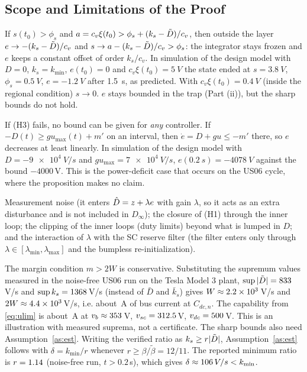 \subsection{Scope and Limitations of the Proof}\label{ap:limits}
\begin{remark}\label{rem:deadlock}
If $s(t_0)>\phi_s$ and $a=c_v\xi(t_0)>\phi_s+(k_s-\tilde{D})/c_v$, then outside the layer $e\to-(k_s-\tilde{D})/c_v$ and $s\to a-(k_s-\tilde{D})/c_v>\phi_s$: the integrator stays frozen and $e$ keeps a constant offset of order $k_s/c_v$. In simulation of the design model with $D=0$, $k_s=k_{\min}$, $e(t_0)=0$ and $c_v\xi(t_0)=\SI{5}{V}$ the state ended at $s=\SI{3.8}{V}$, $\phi_s=\SI{0.5}{V}$, $e=\SI{-1.2}{V}$ after \SI{1.5}{s}, as predicted. With $c_v\xi(t_0)=\SI{0.4}{V}$ (inside the regional condition) $s\to0$. $e$ stays bounded in the trap (Part (ii)), but the sharp bounds do not hold.
\end{remark}
\begin{remark}\label{rem:deficit}
If (H3) fails, no bound can be given for \emph{any} controller. If $-D(t)\ge gu_{\max}(t)+m'$ on an interval, then $\dot e=D+gu\le-m'$ there, so $e$ decreases at least linearly. In simulation of the design model with $D=\SI{-9e4}{V/s}$ and $gu_{\max}=\SI{7e4}{V/s}$, $e(\SI{0.2}{s})=\SI{-4078}{V}$ against the bound $-4000$\,V. This is the power-deficit case that occurs on the US06 cycle, where the proposition makes no claim.
\end{remark}
\begin{remark}
Measurement noise (it enters $\hat{D}=z+\lambda e$ with gain $\lambda$, so it acts as an extra disturbance and is not included in $D_\infty$); the closure of (H1) through the inner loop; the clipping of the inner loops (duty limits) beyond what is lumped in $D$; and the interaction of $\lambda$ with the SC reserve filter (the filter enters only through $\lambda\in[\lambda_{\min},\lambda_{\max}]$ and the bumpless re-initialization).
\end{remark}
\begin{remark}
The margin condition $m>2W$ is conservative. Substituting the supremum values measured in the noise-free US06 run on the Tesla Model 3 plant, $\sup|\tilde{D}|=833$\,V/s and $\sup k_s=1368$\,V/s (instead of $\bar D$ and $\bar k_s$) gives $W\approx2.2\times10^{3}$\,V/s and $2W\approx4.4\times10^{3}$\,V/s, i.e. about \AppTwoWA\,A of bus current at $C_{dc,n}$. The capability from \eqref{eq:ulim} is about \AppCap\,A at $v_b\approx353$\,V, $v_{sc}=312.5$\,V, $v_{dc}=500$\,V. This is an illustration with measured suprema, not a certificate. The sharp bounds also need Assumption~\ref{as:est}. Writing the verified ratio as $k_s\ge r|\tilde{D}|$, Assumption~\ref{as:est} follows with $\delta=k_{\min}/r$ whenever $r\ge\beta/\tilde\beta=12/11$. The reported minimum ratio is $r=1.14$ (noise-free run, $t>0.2$\,s), which gives $\delta\approx106\,V/s<k_{\min}$.
\end{remark}

